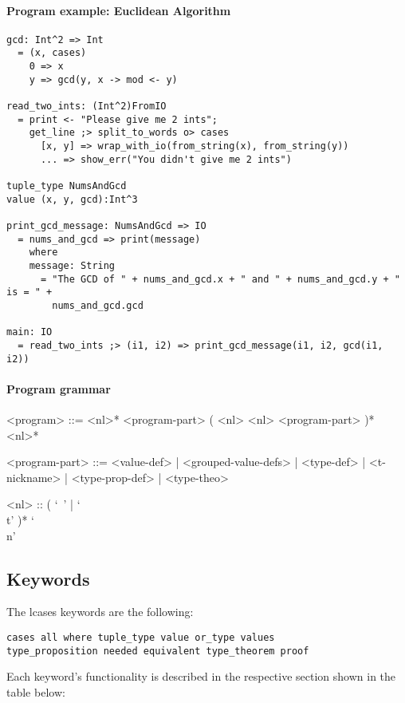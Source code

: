 \documentclass{article}
\begin{document}
\paragraph{Program example: Euclidean Algorithm}
\begin{verbatim}
gcd: Int^2 => Int
  = (x, cases)
    0 => x
    y => gcd(y, x -> mod <- y) 

read_two_ints: (Int^2)FromIO
  = print <- "Please give me 2 ints";
    get_line ;> split_to_words o> cases
      [x, y] => wrap_with_io(from_string(x), from_string(y))
      ... => show_err("You didn't give me 2 ints")

tuple_type NumsAndGcd
value (x, y, gcd):Int^3

print_gcd_message: NumsAndGcd => IO
  = nums_and_gcd => print(message)
    where
    message: String
      = "The GCD of " + nums_and_gcd.x + " and " + nums_and_gcd.y + " is = " +
        nums_and_gcd.gcd

main: IO
  = read_two_ints ;> (i1, i2) => print_gcd_message(i1, i2, gcd(i1, i2))
\end{verbatim}

\paragraph{Program grammar}
\begin{grammar}
<program> ::=
<nl>* <program-part> ( <nl> <nl> <program-part> )* <nl>*

<program-part> ::=
<value-def> | <grouped-value-defs> | <type-def> | <t-nickname> |
<type-prop-def> | <type-theo>

<nl> :: ( `\ ' | `\\t' )* `\\n'
\end{grammar}

\subsection{Keywords}

The lcases keywords are the following:
\begin{verbatim}
cases all where tuple_type value or_type values
type_proposition needed equivalent type_theorem proof
\end{verbatim}
Each keyword's functionality is described in the respective section shown in
the table below:
\end{document}

